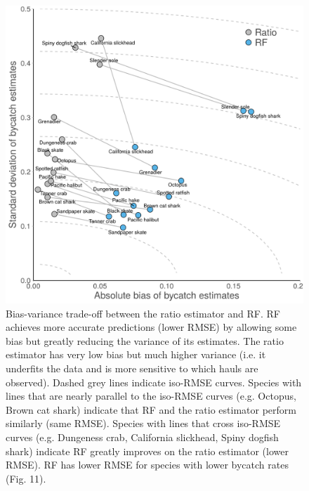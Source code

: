 \documentclass[]{article}
\begin{document}
\begin{figure}

{\centering \includegraphics[width=6in]{../figures/supplement/fig7_tradeoffs_v2} 

}

\caption{Bias-variance trade-off between the ratio estimator and RF. RF achieves more accurate predictions (lower RMSE) by allowing some bias but greatly reducing the variance of its estimates. The ratio estimator has very low bias but much higher variance (i.e. it underfits the data and is more sensitive to which hauls are observed). Dashed grey lines indicate iso-RMSE curves. Species with lines that are nearly parallel to the iso-RMSE curves (e.g. Octopus, Brown cat shark) indicate that RF and the ratio estimator perform similarly (same RMSE). Species with lines that cross iso-RMSE curves (e.g. Dungeness crab, California slickhead, Spiny dogfish shark) indicate RF greatly improves on the ratio estimator (lower RMSE). RF has lower RMSE for species with lower bycatch rates (Fig. 11).}\label{fig:variance-bias}
\end{figure}

\pagebreak
\end{document}
